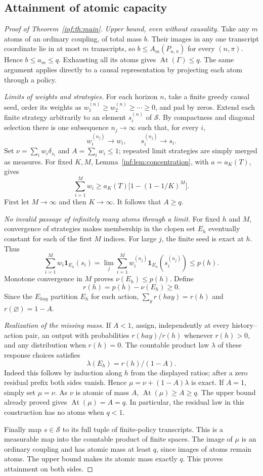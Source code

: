 \documentclass[11pt,a4paper]{article}
\theoremstyle{definition}\newtheorem{definition}[theorem]{Definition}
\theoremstyle{remark}\newtheorem{remark}[theorem]{Remark}
\newcommand{\cS}{\mathcal S}
\newcommand{\At}{\operatorname{At}}
\numberwithin{equation}{section}
\begin{document}
\subsection{Attainment of atomic capacity}
\begin{proof}[Proof of Theorem~\ref{inf:th:main}]
\emph{Upper bound, even without causality.}
Take any $m$ atoms of an ordinary coupling, of total mass $b$. Their
images in any one transcript coordinate lie in at most $m$ transcripts,
so $b\le A_m(P_{n,\pi})$ for every $(n,\pi)$. Hence $b\le a_m\le q$.
Exhausting all its atoms gives $\At(\Gamma)\le q$. The same argument
applies directly to a causal representation by projecting each atom
through a policy.

\emph{Limits of weights and strategies.}
For each horizon $n$, take a finite greedy causal seed, order its weights
as $w^{(n)}_1\ge w^{(n)}_2\ge\cdots\ge0$, and pad by zeros.
Extend each finite strategy arbitrarily to an element $s^{(n)}_i$ of
$\cS$. By compactness and diagonal selection there is one subsequence
$n_j\to\infty$ such that, for every $i$,
\[
 w_i^{(n_j)}\to w_i,\qquad s_i^{(n_j)}\to s_i.
\]
Set $\nu=\sum_iw_i\delta_{s_i}$ and $A=\sum_iw_i\le1$; repeated
limit strategies are simply merged as measures. For fixed $K,M$,
Lemma~\ref{inf:lem:concentration}, with $a=a_K(T)$, gives
\[
 \sum_{i=1}^M w_i
 \ge a_K(T)\bigl[1-(1-1/K)^M\bigr].
\]
First let $M\to\infty$ and then $K\to\infty$. It follows that
$A\ge q$.

\emph{No invalid passage of infinitely many atoms through a limit.}
For fixed $h$ and $M$, convergence of strategies makes membership in
the clopen set $E_h$ eventually constant for each of the first $M$
indices. For large $j$, the finite seed is exact at $h$. Thus
\[
 \sum_{i=1}^M w_i\mathbf1_{E_h}(s_i)
 =\lim_j\sum_{i=1}^M w_i^{(n_j)}\mathbf1_{E_h}(s_i^{(n_j)})
 \le p(h).
\]
Monotone convergence in $M$ proves $\nu(E_h)\le p(h)$. Define
\[
 r(h)=p(h)-\nu(E_h)\ge0.
\]
Since the $E_{hay}$ partition $E_h$ for each action,
$\sum_y r(hay)=r(h)$ and $r(\varnothing)=1-A$.

\emph{Realization of the missing mass.}
If $A<1$, assign, independently at every history--action pair, an output
with probabilities $r(hay)/r(h)$ whenever $r(h)>0$, and any distribution
when $r(h)=0$. The countable product law $\lambda$ of these response
choices satisfies
\[
 \lambda(E_h)=r(h)/(1-A).
\]
Indeed this follows by induction along $h$ from the displayed ratios;
after a zero residual prefix both sides vanish. Hence
$\mu=\nu+(1-A)\lambda$ is exact. If $A=1$, simply set $\mu=\nu$.
As $\nu$ is atomic of mass $A$, $\At(\mu)\ge A\ge q$.
The upper bound already proved gives $\At(\mu)=A=q$. In particular,
the residual law in this construction has no atoms when $q<1$.

Finally map $s\in\cS$ to its full tuple of finite-policy transcripts.
This is a measurable map into the countable product of finite spaces.
The image of $\mu$ is an ordinary coupling and has atomic mass at least
$q$, since images of atoms remain atoms. The upper bound makes its
atomic mass exactly $q$. This proves attainment on both sides.
\end{proof}
\end{document}
